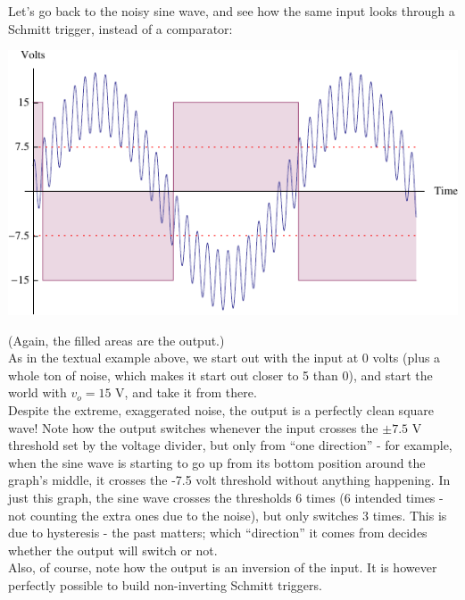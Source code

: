 \documentclass[12pt,a4paper]{report}
\begin{document}
Let's go back to the noisy sine wave, and see how the same input looks through a Schmitt trigger, instead of a comparator:

\includegraphics[scale=1.5]{Graphics/schmitt_noise}

(Again, the filled areas are the output.)\\
As in the textual example above, we start out with the input at $0$ volts (plus a whole ton of noise, which makes it start out closer to 5 than 0), and start the world with $v_o = 15$ V, and take it from there.\\
Despite the extreme, exaggerated noise, the output is a perfectly clean square wave! Note how the output switches whenever the input crosses the $\pm 7.5$ V threshold set by the voltage divider, but only from ``one direction'' - for example, when the sine wave is starting to go up from its bottom position around the graph's middle, it crosses the -7.5 volt threshold without anything happening. In just this graph, the sine wave crosses the thresholds 6 times (6 intended times - not counting the extra ones due to the noise), but only switches 3 times. This is due to hysteresis - the past matters; which ``direction'' it comes from decides whether the output will switch or not.\\
Also, of course, note how the output is an inversion of the input. It is however perfectly possible to build non-inverting Schmitt triggers.\\
\end{document}

